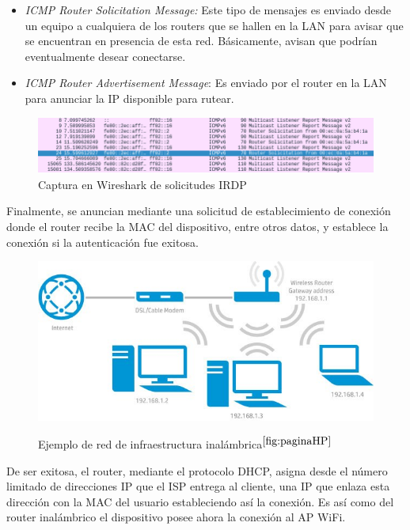 \begin{itemize}
\item{\textit{ICMP Router Solicitation Message:} Este tipo de mensajes es enviado desde un equipo a cualquiera de los routers que se hallen en la LAN para avisar que se encuentran en presencia de esta red. Básicamente, avisan que podrían eventualmente desear conectarse.}
\item{\textit{ICMP Router Advertisement Message}: Es enviado por el router en la LAN para anunciar la IP disponible para rutear.}\\
\end{itemize}

\begin{figure}[h!]
\centering
\includegraphics[scale=0.5]{./imagenes/IRDP}
\caption{Captura en Wireshark de solicitudes IRDP}
\label{fig:IRDP}
\end{figure}

Finalmente, se anuncian mediante una solicitud de establecimiento de conexión donde el router recibe la MAC del dispositivo, entre otros datos, y establece la conexión si la autenticación fue exitosa.\\


\begin{figure}[h!]
\centering
		\includegraphics[scale=0.7]{./imagenes/ap}
		\label{fig:access_point}
		\caption{Ejemplo de red de infraestructura inalámbrica$^{\ref{fig:paginaHP}}$}
\end{figure}

De ser exitosa, el router, mediante el protocolo \ac{DHCP}, asigna desde el número limitado de direcciones IP que el \ac{ISP} entrega al cliente, una IP que enlaza esta dirección con la MAC del usuario estableciendo así la conexión. Es así como del router inalámbrico el dispositivo posee ahora la conexión al AP WiFi.


